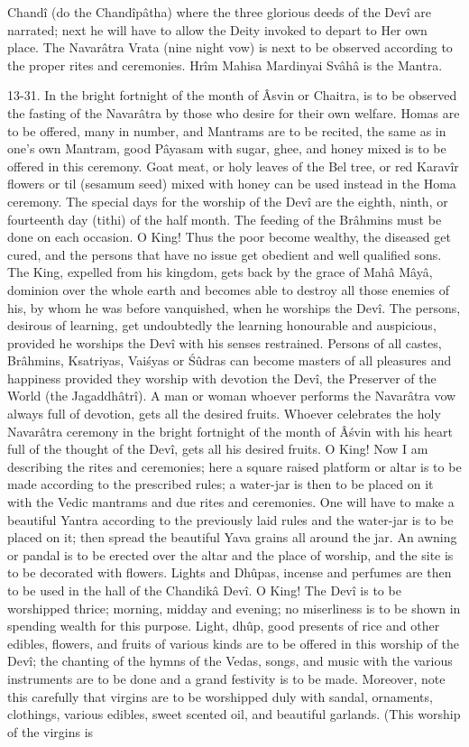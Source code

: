 Chand\^i (do the Chand\^ip\^atha) where the three glorious deeds of the Dev\^i are narrated; next he will have to allow the Deity invoked to depart to Her own place. The Navar\^atra Vrata (nine night vow) is next to be observed according to the proper rites and ceremonies. Hr\^im Mahisa Mardinyai Sv\^ah\^a is the Mantra.

13-31. In the bright fortnight of the month of \^Asvin or Chaitra, is to be observed the fasting of the Navar\^atra by those who desire for their own welfare. Homas are to be offered, many in number, and Mantrams are to be recited, the same as in one's own Mantram, good P\^ayasam with sugar, ghee, and honey mixed is to be offered in this ceremony. Goat meat, or holy leaves of the Bel tree, or red Karav\^ir flowers or til (sesamum seed) mixed with honey can be used instead in the Homa ceremony. The special days for the worship of the Dev\^i are the eighth, ninth, or fourteenth day (tithi) of the half month. The feeding of the Br\^ahmins must be done on each occasion. O King! Thus the poor become wealthy, the diseased get cured, and the persons that have no issue get obedient and well qualified sons. The King, expelled from his kingdom, gets back by the grace of Mah\^a M\^ay\^a, dominion over the whole earth and becomes able to destroy all those enemies of his, by whom he was before vanquished, when he worships the Dev\^i. The persons, desirous of learning, get undoubtedly the learning honourable and auspicious, provided he worships the Dev\^i with his senses restrained. Persons of all castes, Br\^ahmins, Ksatriyas, Vai\'syas or \'S\^udras can become masters of all pleasures and happiness provided they worship with devotion the Dev\^i, the Preserver of the World (the Jagaddh\^atr\^i). A man or woman whoever performs the Navar\^atra vow always full of devotion, gets all the desired fruits. Whoever celebrates the holy Navar\^atra ceremony in the bright fortnight of the month of \^A\'svin with his heart full of the thought of the Dev\^i, gets all his desired fruits. O King! Now I am describing the rites and ceremonies; here a square raised platform or altar is to be made according to the prescribed rules; a water-jar is then to be placed on it with the Vedic mantrams and due rites and ceremonies. One will have to make a beautiful Yantra according to the previously laid rules and the water-jar is to be placed on it; then spread the beautiful Yava grains all around the jar. An awning or pandal is to be erected over the altar and the place of worship, and the site is to be decorated with flowers. Lights and Dh\^upas, incense and perfumes are then to be used in the hall of the Chandik\^a Dev\^i. O King! The Dev\^i is to be worshipped thrice; morning, midday and evening; no miserliness is to be shown in spending wealth for this purpose. Light, dh\^up, good presents of rice and other edibles, flowers, and fruits of various kinds are to be offered in this worship of the Dev\^i; the chanting of the hymns of the Vedas, songs, and music with the various instruments are to be done and a grand festivity is to be made. Moreover, note this carefully that virgins are to be worshipped duly with sandal, ornaments, clothings, various edibles, sweet scented oil, and beautiful garlands. (This worship of the virgins is 